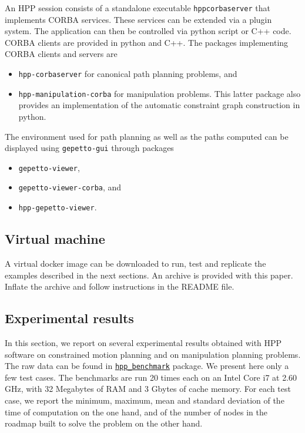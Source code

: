 An HPP session consists of a standalone executable \texttt{hppcorbaserver}
that implements CORBA services. These services can be extended via a plugin
system. The application can then be controlled via python script or C++ code.
CORBA clients are provided in python and C++. The packages implementing CORBA
clients and servers are
\begin{itemize}
\item \texttt{hpp-corbaserver} for canonical path planning problems, and
\item \texttt{hpp-manipulation-corba} for manipulation problems. This
latter package also provides an implementation of the automatic constraint graph
construction in python.
\end{itemize}
The environment used for path planning as well as the paths computed can be
displayed using \texttt{gepetto-gui} through packages
\begin{itemize}
  \item\texttt{gepetto-viewer},
  \item\texttt{gepetto-viewer-corba}, and
  \item\texttt{hpp-gepetto-viewer}.
\end{itemize}

\subsection{Virtual machine}

A virtual docker image can be downloaded to run, test and replicate the
examples described in the next sections. An archive is provided with this paper.
Inflate the archive and follow instructions in the README file.

\subsection{Experimental results}\label{sec:benchmarks}

In this section, we report on several experimental results obtained
with HPP software on constrained motion planning and on manipulation
planning problems. The raw data can be found in
\href{https://github.com/humanoid-path-planner/hpp_benchmark/tree/v4.10.0/2020-07-23}{\texttt{hpp\_benchmark}} package. We present here only a few test cases.
The benchmarks are run 20 times each on an Intel Core i7 at 2.60 GHz, with 32 Megabytes of RAM and 3 Gbytes of cache memory. For each test case, we report the minimum, maximum, mean and standard deviation of the time of computation on the one hand, and of the number of nodes in the roadmap built to solve the problem on the other hand.

